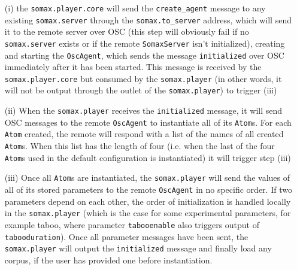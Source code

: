 \begin{itemize}
\item[(i)] the \texttt{somax.player.core} will send the \texttt{create\_agent} message to any existing \texttt{somax.server} through the \texttt{somax.to\_server} address, which will send it to the remote server over OSC (this step will obviously fail if no \texttt{somax.server} exists or if the remote \texttt{SomaxServer} isn't initialized), creating and starting the \texttt{OscAgent}, which sends the message \texttt{initialized} over OSC immediately after it has been started. This message is received by the \texttt{somax.player.core} but consumed by the \texttt{somax.player} (in other words, it will not be output through the outlet of the \texttt{somax.player}) to trigger (iii)

\item[(ii)] When the \texttt{somax.player} receives the \texttt{initialized} message, it will send OSC messages to the remote \texttt{OscAgent} to instantiate all of its \texttt{Atom}s. For each \texttt{Atom} created, the remote will respond with a list of the names of all created \texttt{Atom}s. When this list has the length of four (i.e. when the last of the four \texttt{Atom}s used in the default configuration is instantiated) it will trigger step (iii)

\item[(iii)] Once all \texttt{Atom}s are instantiated, the \texttt{somax.player} will send the values of all of its stored parameters to the remote \texttt{OscAgent} in no specific order. If two parameters depend on each other, the order of initialization is handled locally in the \texttt{somax.player} (which is the case for some experimental parameters, for example taboo, where parameter \texttt{tabooenable} also triggers output of \texttt{tabooduration}). Once all parameter messages have been sent, the \texttt{somax.player} will output the \texttt{initialized} message and finally load any corpus, if the user has provided one before instantiation.
\end{itemize}

